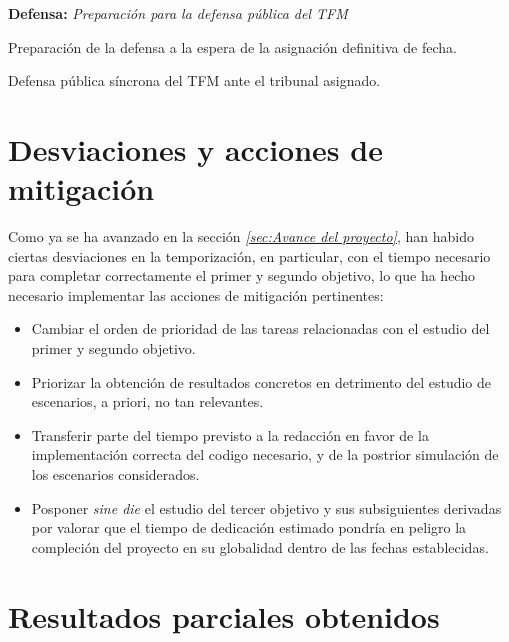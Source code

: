 \documentclass[IB,BIB]{TFUOC}%
\begin{document}
\begin{todolist}
  \item \textbf{Defensa:} \textit{Preparación para la defensa pública del TFM}
  \begin{todolist}
  \item Preparación de la defensa a la espera de la asignación definitiva de fecha.
  \item Defensa pública síncrona del TFM ante el tribunal asignado.
  \end{todolist}
\end{todolist}


\section{Desviaciones y acciones de mitigación}
\label{sec:Desviaciones y acciones de mitigación}

Como ya se ha avanzado en la sección \textit{\ref{sec:Avance del proyecto}}, han habido ciertas desviaciones en la temporización, en particular, con el tiempo necesario para completar correctamente el primer y segundo objetivo, lo que ha hecho necesario implementar las acciones de mitigación pertinentes:

\footnotesize

\begin{itemize}
    \item Cambiar el orden de prioridad de las tareas relacionadas con el estudio del primer y segundo objetivo.
    \item Priorizar la obtención de resultados concretos en detrimento del estudio de escenarios, a priori, no tan relevantes.
    \item Transferir parte del tiempo previsto a la redacción en favor de la implementación correcta del codigo necesario, y
    de la postrior simulación de los escenarios considerados.
    \item Posponer \textit{sine die} el estudio del tercer objetivo y sus subsiguientes derivadas por valorar que el tiempo de
    dedicación estimado pondría en peligro la compleción del proyecto en su globalidad dentro de las fechas establecidas.
\end{itemize}

\normalsize


\section{Resultados parciales obtenidos}
\label{sec:Resultados parciales obtenidos}
\end{document}
